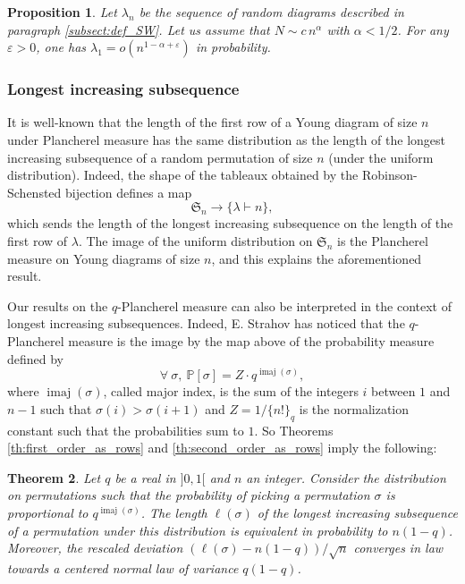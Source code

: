 \documentclass[10pt]{amsart}
\newtheorem{theorem}{Theorem}
\newtheorem{proposition}[theorem]{Proposition}
\theoremstyle{remark}
\newcommand{\sym}{\mathfrak{S}}
\newcommand{\proba}{\mathbb{P}}
\DeclareMathOperator{\imaj}{imaj}
\begin{document}
\begin{proposition}\label{prop:SW_first_row}
Let $\lambda_n$ be the sequence of random diagrams described in paragraph \ref{subsect:def_SW}. Let us assume that $N \sim c \, n^\alpha$ with $\alpha <1/2$. For any $\varepsilon > 0$, one has $\lambda_1=o(n^{1-\alpha+\varepsilon})$ in probability.
\end{proposition}
\bigskip



\subsubsection{Longest increasing subsequence} \label{subsect:ss_suite_croissante}

It is well-known that the length of the first row of a Young diagram of size $n$ under Plancherel measure has the same distribution as the length of the longest increasing subsequence of a random permutation of size $n$ (under the uniform distribution). Indeed, the shape of the tableaux obtained by the Robinson-Schensted bijection defines a map
$$\sym_n \longrightarrow \{\lambda \vdash n\},$$
which sends the length of the longest increasing subsequence on the length of the first row of $\lambda$.
The image of the uniform distribution on $\sym_n$ is the Plancherel measure on Young diagrams of size $n$, and this explains the aforementioned result.\bigskip

Our results on the $q$-Plancherel measure can also be interpreted in the context of longest increasing subsequences. Indeed, E. Strahov \cite{Stra08} has noticed that the $q$-Plancherel measure is the image by the map above of the probability measure defined by
$$\forall \ \sigma,\ \proba[\sigma ] = Z \cdot q^{\imaj(\sigma)},$$
where $\imaj(\sigma)$, called major index, is the sum of the integers $i$ between $1$ and $n-1$ such that $\sigma(i)>\sigma(i+1)$ and $Z=1/\{n!\}_q$ is the normalization constant such that the probabilities sum to $1$. So Theorems \ref{th:first_order_as_rows} and \ref{th:second_order_as_rows} imply the following:

\begin{theorem}
 Let $q$ be a real in $]0,1[$ and $n$ an integer. Consider the distribution on permutations such that the probability of picking a permutation $\sigma$ is proportional to $q^{\imaj(\sigma)}$. The length $\ell(\sigma)$ of the longest increasing subsequence of a permutation under this distribution is equivalent in probability to $n(1-q)$. Moreover, the rescaled deviation $(\ell(\sigma) - n(1-q))/\sqrt{n}$ converges in law towards a centered normal law of variance $q(1-q)$.
\end{theorem}\medskip
\end{document}
